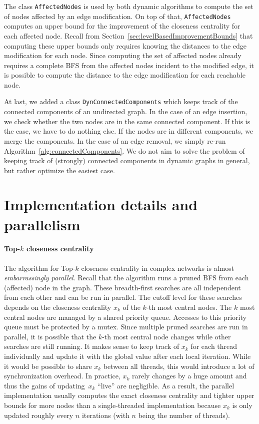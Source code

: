 The class \texttt{AffectedNodes} is used by both dynamic algorithms to compute the set of nodes affected by an edge modification. On top of that, \texttt{AffectedNodes} computes an upper bound for the improvement of the closeness centrality for each affected node. Recall from Section~\ref{sec:levelBasedImprovementBounds} that computing these upper bounds only requires knowing the distances to the edge modification for each node. Since computing the set of affected nodes already requires a complete BFS from the affected nodes incident to the modified edge, it is possible to compute the distance to the edge modification for each reachable node.

At last, we added a class \texttt{DynConnectedComponents} which keeps track of the connected components of an undirected graph. In the case of an edge insertion, we check whether the two nodes are in the same connected component. If this is the case, we have to do nothing else. If the nodes are in different components, we merge the components. In the case of an edge removal, we simply re-run Algorithm~\ref{alg:connectedComponents}. We do not aim to solve the problem of keeping track of (strongly) connected components in dynamic graphs in general, but rather optimize the easiest case.

\section{Implementation details and parallelism}
\paragraph{Top-$k$ closeness centrality}
The algorithm for Top-$k$ closeness centrality in complex networks is almost \emph{embarrassingly parallel}. Recall that the algorithm runs a pruned BFS from each (affected) node in the graph. These breadth-first searches are all independent from each other and can be run in parallel. The cutoff level for these searches depends on the closeness centrality $x_k$ of the $k$-th most central nodes. The $k$ most central nodes are managed by a shared priority queue. Accesses to this priority queue must be protected by a mutex. Since multiple pruned searches are run in parallel, it is possible that the $k$-th most central node changes while other searches are still running. It makes sense to keep track of $x_k$ for each thread individually and update it with the global value after each local iteration. While it would be possible to share $x_k$ between all threads, this would introduce a lot of synchronization overhead. In practice, $x_k$ rarely changes by a huge amount and thus the gains of updating~$x_k$ ``live'' are negligible. As a result, the parallel implementation usually computes the exact closeness centrality and tighter upper bounds for more nodes than a single-threaded implementation because $x_k$ is only updated roughly every $n$ iterations (with $n$ being the number of threads).

